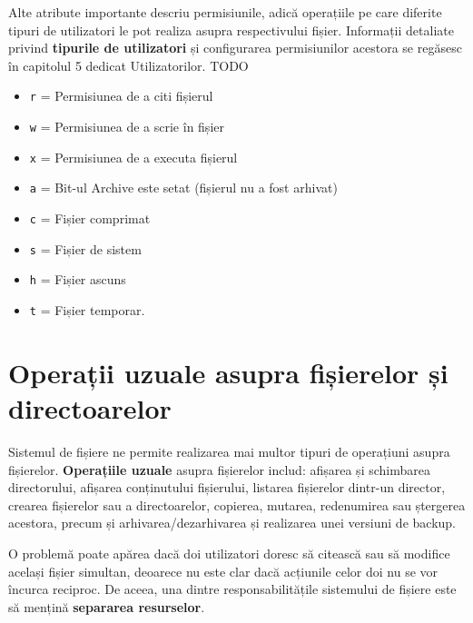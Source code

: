 Alte atribute importante descriu permisiunile, adică operațiile pe care diferite
tipuri de utilizatori le pot realiza asupra respectivului fișier. Informații
detaliate privind \textbf{tipurile de utilizatori} și configurarea permisiunilor
acestora se regăsesc în capitolul 5 dedicat Utilizatorilor. TODO


\begin{itemize}
	\item \texttt{r} = Permisiunea de a citi fișierul
	\item \texttt{w} = Permisiunea de a scrie în fișier
	\item \texttt{x} = Permisiunea de a executa fișierul
	\item \texttt{a} = Bit-ul Archive este setat (fișierul nu a fost arhivat)
	\item \texttt{c} = Fișier comprimat
	\item \texttt{s} = Fișier de sistem
	\item \texttt{h} = Fișier ascuns
	\item \texttt{t} = Fișier temporar.
\end{itemize}

\section{Operații uzuale asupra fișierelor și directoarelor}

Sistemul de fișiere ne permite realizarea mai multor tipuri de operațiuni asupra
fișierelor.  \textbf{Operațiile uzuale} asupra fișierelor includ: afișarea și
schimbarea directorului, afișarea conținutului fișierului, listarea fișierelor
dintr-un director, crearea fișierelor sau a directoarelor, copierea, mutarea,
redenumirea sau ștergerea acestora, precum și arhivarea/dezarhivarea și
realizarea unei versiuni de backup.

O problemă poate apărea dacă doi utilizatori doresc să citească sau să modifice
același fișier simultan, deoarece nu este clar dacă acțiunile celor doi nu se
vor încurca reciproc. De aceea, una dintre responsabilitățile sistemului de
fișiere este să mențină \textbf{separarea resurselor}.

